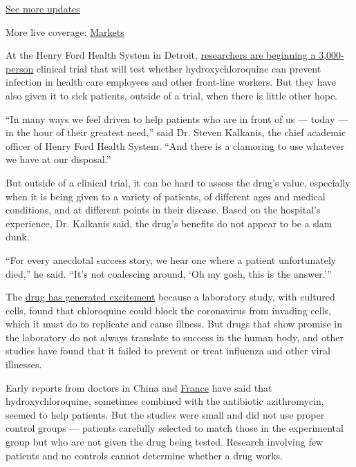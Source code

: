 \href{https://www.nytimes3xbfgragh.onion/2020/08/01/world/coronavirus-covid-19.html?action=click\&pgtype=Article\&state=default\&region=MAIN_CONTENT_1\&context=storylines_live_updates}{See
more updates}

More live coverage:
\href{https://www.nytimes3xbfgragh.onion/live/2020/07/31/business/stock-market-today-coronavirus?action=click\&pgtype=Article\&state=default\&region=MAIN_CONTENT_1\&context=storylines_live_updates}{Markets}

At the Henry Ford Health System in Detroit,
\href{https://www.henryford.com/news/2020/04/hfhs-leads-national-study-to-determine-drugs-effectiveness-in-preventing-covid19}{researchers
are beginning a 3,000-person} clinical trial that will test whether
hydroxychloroquine can prevent infection in health care employees and
other front-line workers. But they have also given it to sick patients,
outside of a trial, when there is little other hope.

``In many ways we feel driven to help patients who are in front of us
--- today --- in the hour of their greatest need,'' said Dr. Steven
Kalkanis, the chief academic officer of Henry Ford Health System. ``And
there is a clamoring to use whatever we have at our disposal.''

But outside of a clinical trial, it can be hard to assess the drug's
value, especially when it is being given to a variety of patients, of
different ages and medical conditions, and at different points in their
disease. Based on the hospital's experience, Dr. Kalkanis said, the
drug's benefits do not appear to be a slam dunk.

``For every anecdotal success story, we hear one where a patient
unfortunately died,'' he said. ``It's not coalescing around, `Oh my
gosh, this is the answer.'''

The
\href{https://www.nytimes3xbfgragh.onion/article/coronavirus-hydroxychloroquine-malaria.html}{drug
has generated excitement} because a laboratory study, with cultured
cells, found that chloroquine could block the coronavirus from invading
cells, which it must do to replicate and cause illness. But drugs that
show promise in the laboratory do not always translate to success in the
human body, and other studies have found that it failed to prevent or
treat influenza and other viral illnesses.

Early reports from doctors in China and
\href{https://www.sciencedirect.com/science/article/pii/S0924857920300996}{France}
have said that hydroxychloroquine, sometimes combined with the
antibiotic azithromycin, seemed to help patients. But the studies were
small and did not use proper control groups --- patients carefully
selected to match those in the experimental group but who are not given
the drug being tested. Research involving few patients and no controls
cannot determine whether a drug works.


